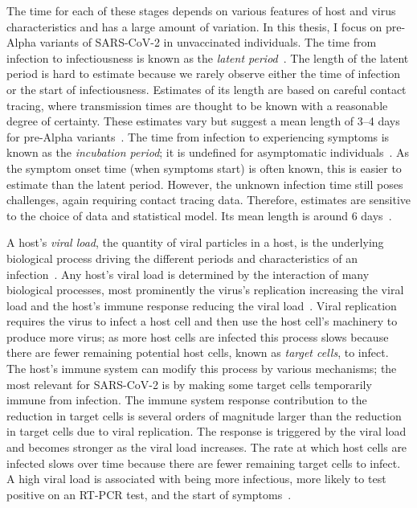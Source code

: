 \documentclass[thesis.tex]{subfiles}
\begin{document}
The time for each of these stages depends on various features of host and virus characteristics and has a large amount of variation.
In this thesis, I focus on pre-Alpha variants of SARS-CoV-2 in unvaccinated individuals.
The time from infection to infectiousness is known as the \emph{latent period}~\autocite{goughEstimation}.
The length of the latent period is hard to estimate because we rarely observe either the time of infection or the start of infectiousness.
Estimates of its length are based on careful contact tracing, where transmission times are thought to be known with a reasonable degree of certainty.
These estimates vary but suggest a mean length of 3--4 days for pre-Alpha variants~\autocite[and references therein]{zhaoEstimating}.
The time from infection to experiencing symptoms is known as the \emph{incubation period}; it is undefined for asymptomatic individuals~\autocite{portaEpiDictionary}.
As the symptom onset time (when symptoms start) is often known, this is easier to estimate than the latent period.
However, the unknown infection time still poses challenges, again requiring contact tracing data.
Therefore, estimates are sensitive to the choice of data and statistical model.
Its mean length is around 6 days~\autocite{wuIncubation,raiIncubation,aleneSerial}.

A host's \emph{viral load}, the quantity of viral particles in a host, is the underlying biological process driving the different periods and characteristics of an infection~\autocite{puhachSARSCoV2}.
Any host's viral load is determined by the interaction of many biological processes, most prominently the virus's replication increasing the viral load and the host's immune response reducing the viral load~\autocite{keVivo}.
Viral replication requires the virus to infect a host cell and then use the host cell's machinery to produce more virus; as more host cells are infected this process slows because there are fewer remaining potential host cells, known as \emph{target cells}, to infect.
The host's immune system can modify this process by various mechanisms; the most relevant for SARS-CoV-2 is by making some target cells temporarily immune from infection.
The immune system response contribution to the reduction in target cells is several orders of magnitude larger than the reduction in target cells due to viral replication.
The response is triggered by the viral load and becomes stronger as the viral load increases.
The rate at which host cells are infected slows over time because there are fewer remaining target cells to infect.
A high viral load is associated with being more infectious, more likely to test positive on an RT-PCR test, and the start of symptoms~\autocite{puhachSARSCoV2,keVivo}.
\end{document}
